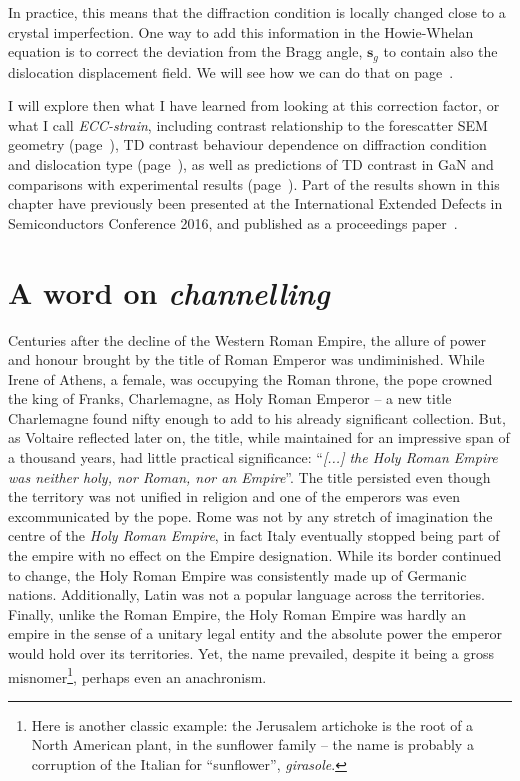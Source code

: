 In practice, this means that the diffraction condition is locally changed close to a crystal imperfection. One way to add this information in the Howie-Whelan equation is to correct the deviation from the Bragg angle, $\textbf{s}_g$ to contain also the dislocation displacement field. We will see how we can do that on page~\pageref{sec:beta}.

I will explore then what I have learned from looking at this correction factor, or what I call \textit{ECC-strain}, including contrast relationship to the forescatter SEM geometry (page~\pageref{sec:tilteffect}), TD contrast behaviour dependence on diffraction condition and dislocation type (page~\pageref{sec:betacomparisons}), as well as predictions of TD contrast in GaN and comparisons with experimental results (page~\pageref{sec:contrastGaN}). Part of the results shown in this chapter have previously been presented at the International Extended Defects in Semiconductors Conference 2016, and published as a proceedings paper~\cite{ElenaECCI}.

\section{A word on \textit{channelling}}
\label{sec:channelling}



Centuries after the decline of the Western Roman Empire, the allure of power and honour brought by the title of Roman Emperor was undiminished. While Irene of Athens, a female, was occupying the Roman throne, the pope crowned the king of Franks, Charlemagne, as Holy Roman Emperor -- a new title Charlemagne found nifty enough to add to his already significant collection. But, as Voltaire reflected later on, the title, while maintained for an impressive span of a thousand years, had little practical significance: ``\textit{[...] the Holy Roman Empire was neither holy, nor Roman, nor an Empire}''. The title persisted even though the territory was not unified in religion and one of the emperors was even excommunicated by the pope. Rome was not by any stretch of imagination the centre of the \textit{Holy Roman Empire}, in fact Italy eventually stopped being part of the empire with no effect on the Empire designation. While its border continued to change, the Holy Roman Empire was consistently made up of Germanic nations. Additionally, Latin was not a popular language across the territories. Finally, unlike the Roman Empire, the Holy Roman Empire was hardly an empire in the sense of a unitary legal entity and the absolute power the emperor would hold over its territories. Yet, the name prevailed, despite it being a gross misnomer\footnote{Here is another classic example: the Jerusalem artichoke is the root of a North American plant, in the sunflower family -- the name is probably a corruption of the Italian for ``sunflower'', \textit{girasole}.}, perhaps even an anachronism. 

